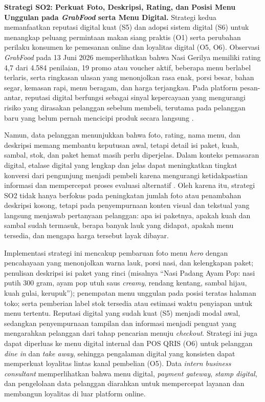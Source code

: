 \textbf{Strategi SO2: Perkuat Foto, Deskripsi, Rating, dan Posisi Menu Unggulan pada \textit{GrabFood} serta Menu Digital.} Strategi kedua memanfaatkan reputasi digital kuat (S5) dan adopsi sistem digital (S6) untuk menangkap peluang permintaan makan siang praktis (O1) serta perubahan perilaku konsumen ke pemesanan online dan loyalitas digital (O5, O6). Observasi \textit{GrabFood} pada 13 Juni 2026 memperlihatkan bahwa Nasi Gerilya memiliki rating 4,7 dari 4.584 penilaian, 19 promo atau voucher aktif, beberapa menu berlabel terlaris, serta ringkasan ulasan yang menonjolkan rasa enak, porsi besar, bahan segar, kemasan rapi, menu beragam, dan harga terjangkau. Pada platform pesan-antar, reputasi digital berfungsi sebagai sinyal kepercayaan yang mengurangi risiko yang dirasakan pelanggan sebelum membeli, terutama pada pelanggan baru yang belum pernah mencicipi produk secara langsung \parencite{chaffey2022digitalmarketing,sophia2025rendanggadih}.

Namun, data pelanggan menunjukkan bahwa foto, rating, nama menu, dan deskripsi memang membantu keputusan awal, tetapi detail isi paket, kuah, sambal, stok, dan paket hemat masih perlu diperjelas. Dalam konteks pemasaran digital, etalase digital yang lengkap dan jelas dapat meningkatkan tingkat konversi dari pengunjung menjadi pembeli karena mengurangi ketidakpastian informasi dan mempercepat proses evaluasi alternatif \parencite{chaffey2022digitalmarketing,kotler2023principlesmarketing}. Oleh karena itu, strategi SO2 tidak hanya berfokus pada peningkatan jumlah foto atau penambahan deskripsi kosong, tetapi pada penyempurnaan konten visual dan tekstual yang langsung menjawab pertanyaan pelanggan: apa isi paketnya, apakah kuah dan sambal sudah termasuk, berapa banyak lauk yang didapat, apakah menu tersedia, dan mengapa harga tersebut layak dibayar.

Implementasi strategi ini mencakup pembaruan foto menu \textit{hero} dengan pencahayaan yang menonjolkan warna lauk, porsi nasi, dan kelengkapan paket; penulisan deskripsi isi paket yang rinci (misalnya ``Nasi Padang Ayam Pop: nasi putih 300 gram, ayam pop utuh saus \textit{creamy}, rendang kentang, sambal hijau, kuah gulai, kerupuk''); penempatan menu unggulan pada posisi teratas halaman toko; serta pemberian label stok tersedia atau estimasi waktu penyiapan untuk menu tertentu. Reputasi digital yang sudah kuat (S5) menjadi modal awal, sedangkan penyempurnaan tampilan dan informasi menjadi penguat yang mengarahkan pelanggan dari tahap pencarian menuju \textit{checkout}. Strategi ini juga dapat diperluas ke menu digital internal dan POS QRIS (O6) untuk pelanggan \textit{dine in} dan \textit{take away}, sehingga pengalaman digital yang konsisten dapat memperkuat loyalitas lintas kanal pembelian (O5). Data \textit{intern business consultant} memperlihatkan bahwa menu digital, \textit{payment gateway}, \textit{stamp digital}, dan pengelolaan data pelanggan diarahkan untuk mempercepat layanan dan membangun loyalitas di luar platform online.


